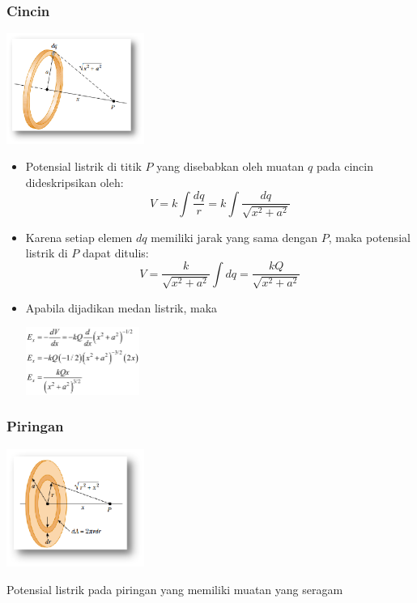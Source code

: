 \documentclass[twocolumn, 11pt]{article}%
\begin{document}
     \subsubsection{Cincin}%
     \begin{center}
         \includegraphics[width=170px]{15.png}
     \end{center}
     \begin{itemize}
         \item Potensial listrik di titik $P$ yang disebabkan oleh muatan $q$ pada cincin dideskripsikan oleh:
             \[V=k\int\frac{dq}r=k\int\frac{dq}{\sqrt{x^2+a^2}} \]
        \item Karena setiap elemen $dq$ memiliki jarak yang sama dengan $P$, maka potensial listrik di $P$ dapat ditulis:   
            \[V=\frac{k}{\sqrt{x^2+a^2}}\int dq=\frac{kQ}{\sqrt{x^2+a^2}}\]
        \item Apabila dijadikan medan listrik, maka
            \begin{center}
                \includegraphics[width=140px]{16.png}
            \end{center}
     \end{itemize}

     \subsubsection{Piringan}%
     \begin{center}
         \includegraphics[width=170px]{13.png}
     \end{center}
     Potensial listrik pada piringan yang memiliki muatan yang seragam
\end{document}
